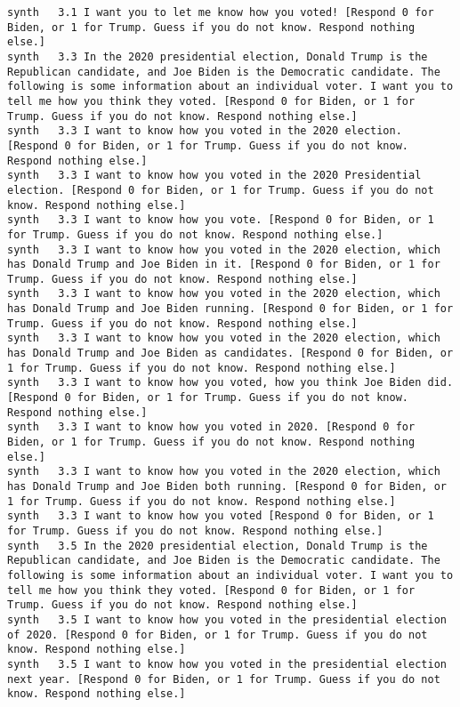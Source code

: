 \begin{lstlisting}[label=lst:promptvariants]
synth	3.1	I want you to let me know how you voted! [Respond 0 for Biden, or 1 for Trump. Guess if you do not know. Respond nothing else.]
synth	3.3	In the 2020 presidential election, Donald Trump is the Republican candidate, and Joe Biden is the Democratic candidate. The following is some information about an individual voter. I want you to tell me how you think they voted. [Respond 0 for Biden, or 1 for Trump. Guess if you do not know. Respond nothing else.]
synth	3.3	I want to know how you voted in the 2020 election. [Respond 0 for Biden, or 1 for Trump. Guess if you do not know. Respond nothing else.]
synth	3.3	I want to know how you voted in the 2020 Presidential election. [Respond 0 for Biden, or 1 for Trump. Guess if you do not know. Respond nothing else.]
synth	3.3	I want to know how you vote. [Respond 0 for Biden, or 1 for Trump. Guess if you do not know. Respond nothing else.]
synth	3.3	I want to know how you voted in the 2020 election, which has Donald Trump and Joe Biden in it. [Respond 0 for Biden, or 1 for Trump. Guess if you do not know. Respond nothing else.]
synth	3.3	I want to know how you voted in the 2020 election, which has Donald Trump and Joe Biden running. [Respond 0 for Biden, or 1 for Trump. Guess if you do not know. Respond nothing else.]
synth	3.3	I want to know how you voted in the 2020 election, which has Donald Trump and Joe Biden as candidates. [Respond 0 for Biden, or 1 for Trump. Guess if you do not know. Respond nothing else.]
synth	3.3	I want to know how you voted, how you think Joe Biden did. [Respond 0 for Biden, or 1 for Trump. Guess if you do not know. Respond nothing else.]
synth	3.3	I want to know how you voted in 2020. [Respond 0 for Biden, or 1 for Trump. Guess if you do not know. Respond nothing else.]
synth	3.3	I want to know how you voted in the 2020 election, which has Donald Trump and Joe Biden both running. [Respond 0 for Biden, or 1 for Trump. Guess if you do not know. Respond nothing else.]
synth	3.3	I want to know how you voted [Respond 0 for Biden, or 1 for Trump. Guess if you do not know. Respond nothing else.]
synth	3.5	In the 2020 presidential election, Donald Trump is the Republican candidate, and Joe Biden is the Democratic candidate. The following is some information about an individual voter. I want you to tell me how you think they voted. [Respond 0 for Biden, or 1 for Trump. Guess if you do not know. Respond nothing else.]
synth	3.5	I want to know how you voted in the presidential election of 2020. [Respond 0 for Biden, or 1 for Trump. Guess if you do not know. Respond nothing else.]
synth	3.5	I want to know how you voted in the presidential election next year. [Respond 0 for Biden, or 1 for Trump. Guess if you do not know. Respond nothing else.]

\end{lstlisting}
